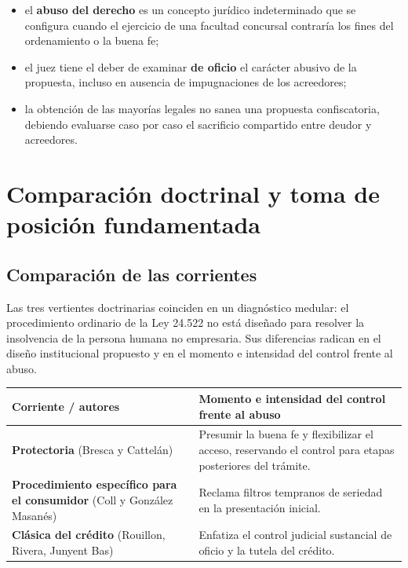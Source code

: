 \documentclass[12pt,oneside]{book}
\begin{document}
\begin{itemize}
    \item el \textbf{abuso del derecho} es un concepto jurídico indeterminado que se configura cuando el ejercicio de una facultad concursal contraría los fines del ordenamiento o la buena fe;
    \item el juez tiene el deber de examinar \textbf{de oficio} el carácter abusivo de la propuesta, incluso en ausencia de impugnaciones de los acreedores;
    \item la obtención de las mayorías legales no sanea una propuesta confiscatoria, debiendo evaluarse caso por caso el sacrificio compartido entre deudor y acreedores.
\end{itemize}

\section{Comparación doctrinal y toma de posición fundamentada}

\subsection{Comparación de las corrientes}

Las tres vertientes doctrinarias coinciden en un diagnóstico medular: el procedimiento ordinario de la Ley 24.522 no está diseñado para resolver la insolvencia de la persona humana no empresaria. Sus diferencias radican en el diseño institucional propuesto y en el momento e intensidad del control frente al abuso.

\begin{table}[H]
\centering
\small
\begin{tabularx}{\textwidth}{>{\raggedright\arraybackslash}p{}>{\raggedright\arraybackslash}X}
\toprule
\textbf{Corriente / autores} & \textbf{Momento e intensidad del control frente al abuso} \\
\midrule
\textbf{Protectoria} (Bresca y Cattelán) & Presumir la buena fe y flexibilizar el acceso, reservando el control para etapas posteriores del trámite. \\
\addlinespace
\textbf{Procedimiento específico para el consumidor} (Coll y González Masanés) & Reclama filtros tempranos de seriedad en la presentación inicial. \\
\addlinespace
\textbf{Clásica del crédito} (Rouillon, Rivera, Junyent Bas) & Enfatiza el control judicial sustancial de oficio y la tutela del crédito. \\
\bottomrule
\end{tabularx}
\end{table}
\end{document}
